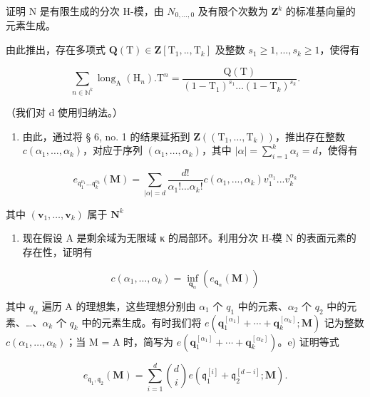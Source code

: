 证明 N 是有限生成的分次 H-模，由 \(N_{0,\ldots,0}\) 及有限个次数为 \(\mathbf{Z}^{k}\) 的标准基向量的元素生成。

由此推出，存在多项式 \(\mathbf{Q}(\mathrm{T}) \in \mathbf{Z}[\mathrm{T}_1,..,\mathrm{T}_k]\) 及整数 \(s_1 \geqslant 1, ..., s_k \geqslant 1\)，使得有

\[
\sum_ {n \in \mathbb {N} ^ {k}} \operatorname{long} _ {\mathrm{A}} (\mathrm{H} _ {n}). \mathrm{T} ^ {n} = \frac {\mathrm{Q} (\mathrm{T})}{(1 - \mathrm{T} _ {1}) ^ {s _ {1}} \dots (1 - \mathrm{T} _ {k}) ^ {s _ {k}}}.
\]

（我们对 d 使用归纳法。）

\begin{enumerate}
\def\labelenumi{\alph{enumi})}
\setcounter{enumi}{2}
\tightlist
\item
  由此，通过将 § 6, no. 1 的结果延拓到 \(\mathbf{Z}((\mathrm{T}_{1},\ldots,\mathrm{T}_{k}))\)，推出存在整数 \(c(\alpha_{1},\ldots,\alpha_{k})\)，对应于序列 \((\alpha_{1},\ldots,\alpha_{k})\)，其中 \(|\alpha| = \sum_{i=1}^{k}\alpha_{i} = d\)，使得有
\end{enumerate}

\[
e _ {\mathfrak {q} _ {1} ^ {\nu_ {1}} \dots \mathfrak {q} _ {k} ^ {\nu_ {k}}} (\mathbf {M}) = \sum_ {| \alpha | = d} \frac {d !}{\alpha_ {1} ! \dots \alpha_ {k} !} c (\alpha_ {1},..., \alpha_ {k}) v _ {1} ^ {\alpha_ {1}}... v _ {k} ^ {\alpha_ {k}}
\]

其中 \((\mathbf{v}_1,\dots,\mathbf{v}_k)\) 属于 \(\mathbf{N}^k\)

\begin{enumerate}
\def\labelenumi{\alph{enumi})}
\setcounter{enumi}{3}
\tightlist
\item
  现在假设 A 是剩余域为无限域 κ 的局部环。利用分次 H-模 N 的表面元素的存在性，证明有
\end{enumerate}

\[
c (\alpha_ {1}, \dots , \alpha_ {k}) = \inf _ {\mathbf {q} _ {\alpha}} (e _ {\mathbf {q} _ {\alpha}} (\mathbf {M}))
\]

  其中 \(q_{\alpha}\) 遍历 A 的理想集，这些理想分别由 \(\alpha_{1}\) 个 \(q_{1}\) 中的元素、\(\alpha_{2}\) 个 \(q_{2}\) 中的元素、\ldots、\(\alpha_{k}\) 个 \(q_{k}\) 中的元素生成。有时我们将 \(e(\mathbf{q}_{1}^{[\alpha_{1}]} + \cdots + \mathbf{q}_{k}^{[\alpha_{k}]}; \mathbf{M})\) 记为整数 \(c(\alpha_{1}, \ldots, \alpha_{k})\)；当 M = A 时，简写为 \(e(\mathbf{q}_{1}^{[\alpha_{1}]} + \cdots + \mathbf{q}_{k}^{[\alpha_{k}]})\)。e) 证明等式

\[
e _ {\mathfrak {q} _ {1}, \mathfrak {q} _ {2}} (\mathbf {M}) = \sum_ {i = 1} ^ {d} \binom {d} {i} e (\mathfrak {q} _ {1} ^ {[ i ]} + \mathfrak {q} _ {2} ^ {[ d - i ]}; \mathbf {M}).
\]

